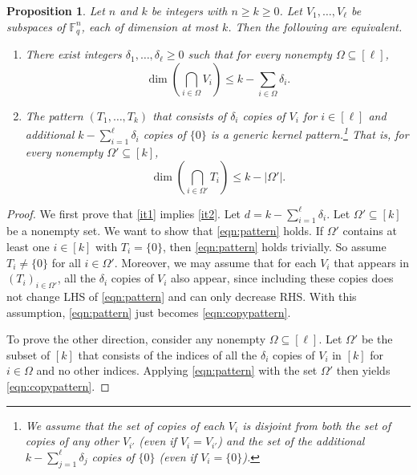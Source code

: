 \documentclass[11pt]{article}
\newif\ifmynotes
\newcommand{\ZGnote}[1]{\ifmynotes\textcolor{purple}{[Zeyu: #1]}\else\fi}
\theoremstyle{plain}
\newtheorem{prop}[thm]{Proposition}
\theoremstyle{definition}
\theoremstyle{remark}
\newcommand{\F}{\mathbb{F}}
\begin{document}
\begin{prop}\label{prop:equivalent}
Let $n$ and $k$ be integers with $n\geq k\geq 0$. Let $V_1,\ldots,V_\ell$ be subspaces of $\F_q^n$, each of dimension at most $k$. Then the following are equivalent. 
\begin{enumerate}
\item\label{it1} There exist integers $\delta_1,\ldots,\delta_\ell\geq 0$ such that for every nonempty $\Omega \subseteq [\ell]$, 
\begin{equation}\label{eqn:copypattern}
\dim\left(\bigcap_{i\in \Omega} V_i\right)\leq k-\sum_{i\in \Omega}\delta_i.
\end{equation}
\item\label{it2} The pattern $(T_1,\ldots,T_k)$ that consists of $\delta_i$ copies of $V_i$ for $i\in [\ell]$ and additional $k-\sum_{i=1}^\ell \delta_i$ copies of $\{0\}$ is a generic kernel pattern.\footnote{We assume that the set of copies of each $V_i$ is disjoint from both the set of copies of any other $V_{i'}$ (even if $V_i = V_{i'}$) and the set of the additional $k - \sum_{j=1}^{\ell} \delta_{j}$ copies of $\{0\}$ (even if $V_i = \{0\}$).} That is, for every nonempty $\Omega'\subseteq [k]$, 
\begin{equation}\label{eqn:pattern}
\dim\left(\bigcap_{i\in \Omega'} T_i\right)\leq k-|\Omega'|.
\end{equation}
\end{enumerate}
\end{prop}
\begin{proof}
We first prove that \cref{it1} implies \cref{it2}. Let $d=k-\sum_{i=1}^\ell \delta_i$. Let $\Omega' \subseteq [k]$ be a nonempty set. We want to show that \eqref{eqn:pattern} holds. If $\Omega'$ contains at least one $i\in [k]$ with $T_i=\{0\}$, then \eqref{eqn:pattern} holds trivially. So assume $T_i\neq \{0\}$ for all $i\in \Omega'$.
Moreover, we may assume that for each $V_i$ that appears in $(T_i)_{i\in \Omega'}$, all the $\delta_i$ copies of $V_i$ also appear, since including these copies does not change LHS of \eqref{eqn:pattern} and can only decrease RHS. With this assumption, \eqref{eqn:pattern} just becomes \eqref{eqn:copypattern}. 

To prove the other direction, consider any nonempty $\Omega\subseteq [\ell]$. Let $\Omega'$ be the subset of $[k]$ that consists of the indices of all the $\delta_i$ copies of $V_i$ in $[k]$ for $i\in \Omega$ and no other indices. Applying \eqref{eqn:pattern} with the set $\Omega'$ then yields \eqref{eqn:copypattern}.
\end{proof}
\end{document}
